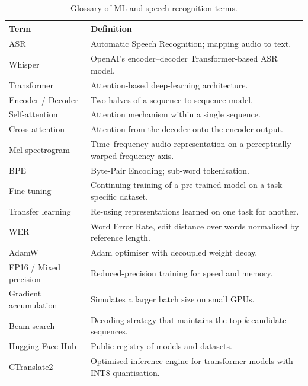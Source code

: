 \documentclass[12pt,a4paper]{report}
\begin{document}
\begin{table}[H]
  \centering
  \caption{Glossary of ML and speech-recognition terms.}
  \label{tab:mt_glossary_ml}
  \renewcommand{\arraystretch}{1.3}
  \begin{tabular}{lp{9cm}}
    \toprule
    \textbf{Term} & \textbf{Definition} \\
    \midrule
    ASR                  & Automatic Speech Recognition; mapping audio to text. \\
    Whisper              & OpenAI's encoder--decoder Transformer-based ASR model. \\
    Transformer          & Attention-based deep-learning architecture. \\
    Encoder / Decoder    & Two halves of a sequence-to-sequence model. \\
    Self-attention       & Attention mechanism within a single sequence. \\
    Cross-attention      & Attention from the decoder onto the encoder
                           output. \\
    Mel-spectrogram      & Time--frequency audio representation on a
                           perceptually-warped frequency axis. \\
    BPE                  & Byte-Pair Encoding; sub-word tokenisation. \\
    Fine-tuning          & Continuing training of a pre-trained model on
                           a task-specific dataset. \\
    Transfer learning    & Re-using representations learned on one task
                           for another. \\
    WER                  & Word Error Rate, edit distance over words
                           normalised by reference length. \\
    AdamW                & Adam optimiser with decoupled weight decay. \\
    FP16 / Mixed precision & Reduced-precision training for speed and
                            memory. \\
    Gradient accumulation & Simulates a larger batch size on small GPUs. \\
    Beam search          & Decoding strategy that maintains the
                           top-$k$ candidate sequences. \\
    Hugging Face Hub     & Public registry of models and datasets. \\
    CTranslate2          & Optimised inference engine for transformer
                           models with INT8 quantisation. \\
    \bottomrule
  \end{tabular}
\end{table}
\end{document}
